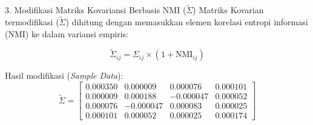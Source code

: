 \begin{frame}{3. Modifikasi Matriks Kovariansi Berbasis NMI ($\tilde{\Sigma}$)}
Matriks Kovarian termodifikasi ($\tilde{\Sigma}$) dihitung dengan memasukkan elemen korelasi entropi informasi (NMI) ke dalam variansi empiris:

$$ \tilde{\Sigma}_{ij} = \Sigma_{ij} \times (1 + \text{NMI}_{ij}) $$

Hasil modifikasi (\textit{Sample Data}):
$$
\tilde{\Sigma} = 
\begin{bmatrix} 
0.000350 & 0.000009 & 0.000076 & 0.000101 \\
0.000009 & 0.000188 & -0.000047 & 0.000052 \\
0.000076 & -0.000047 & 0.000083 & 0.000025 \\
0.000101 & 0.000052 & 0.000025 & 0.000174
\end{bmatrix}
$$
\end{frame}
